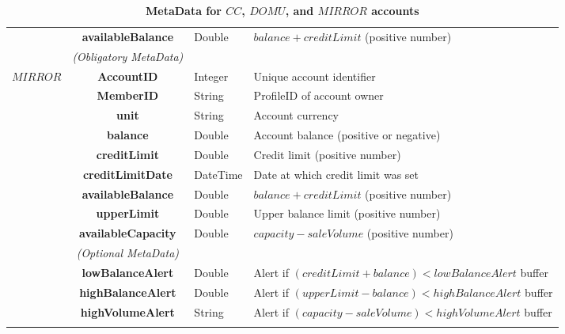\begin{table}[H]
\begin{centering}
{\begin{tabular}{ r | c | l | l }
			& {\bf availableBalance}		&Double	& $balance + creditLimit$ (positive number) \\
\Xhline{1.5pt}
			 & \emph{(Obligatory MetaData)}& & \\
\cline{2-2}
$MIRROR$ 	& {\bf AccountID}			&Integer	& Unique account identifier \\
			& {\bf MemberID}			&String	& ProfileID of account owner \\
			& {\bf unit}					&String	& Account currency \\
			& {\bf balance}				&Double	& Account balance (positive or negative) \\
			& {\bf creditLimit}			&Double	& Credit limit (positive number) \\
			& {\bf creditLimitDate}		&DateTime & Date at which credit limit was set \\
			& {\bf availableBalance}		&Double	& $balance + creditLimit$ (positive number) \\
			& {\bf upperLimit}			&Double	& Upper balance limit (positive number) \\
			& {\bf availableCapacity}		&Double	& $capacity - saleVolume$ (positive number) \\
\cline{2-2}
			 & \emph{(Optional MetaData)}& & \\
\cline{2-2}
			& {\bf lowBalanceAlert}		&Double	& Alert if $(creditLimit + balance) < lowBalanceAlert$ buffer \\
			& {\bf highBalanceAlert}		&Double	& Alert if $(upperLimit - balance) < highBalanceAlert$ buffer \\
			& {\bf highVolumeAlert}		&String	& Alert if $(capacity - saleVolume) < highVolumeAlert$ buffer \\
\Xhline{1.5pt}
\end{tabular}
}
\caption{\small\textbf{MetaData for $CC$, $DOMU$, and $MIRROR$ accounts}}
\label{tab:AccountMetaData1}
\end{centering}
\end{table}

